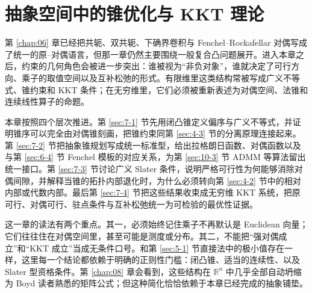 \chapter{抽象空间中的锥优化与 KKT 理论}

\label{chap:07}

第 \ref{chap:06} 章已经把共轭、双共轭、下确界卷积与 Fenchel--Rockafellar 对偶写成了统一的原--对偶语言，但那一章仍然主要围绕一般复合凸问题展开。进入本章之后，约束的几何角色会被进一步突出：谁被视为“非负对象”，谁就决定了可行方向、乘子的取值空间以及互补松弛的形式。有限维里这类结构常被写成广义不等式、锥约束和 KKT 条件；在无穷维里，它们必须被重新表述为对偶空间、法锥和连续线性算子的命题。

本章按照四个层次推进。第 \ref{sec:7-1} 节先用闭凸锥定义偏序与广义不等式，并证明锥序可以完全由对偶锥刻画，把锥约束同第 \ref{sec:4-3} 节的分离原理连接起来。第 \ref{sec:7-2} 节把抽象锥规划写成统一标准型，给出拉格朗日函数、对偶函数以及与第 \ref{sec:6-4} 节 Fenchel 模板的对应关系，为第 \ref{sec:10-3} 节 ADMM 等算法留出统一接口。第 \ref{sec:7-3} 节讨论广义 Slater 条件，说明严格可行性为何能够消除对偶间隙，并解释当锥的拓扑内部退化时，为什么必须转向第 \ref{sec:4-2} 节中的相对内部或代数内部。最后第 \ref{sec:7-4} 节把这些结果收束成无穷维 KKT 系统，把原可行、对偶可行、驻点条件与互补松弛统一为可检验的最优性证据。

这一章的读法有两个重点。其一，必须始终记住乘子不再默认是 Euclidean 向量；它们往往住在对偶空间里，甚至可能是测度或分布。其二，不能把“强对偶成立”和“KKT 成立”当成无条件口号。和第 \ref{sec:5-1} 节直接法中的极小值存在一样，这里每一个结论都依赖于明确的正则性门槛：闭凸锥、适当的连续性、以及 Slater 型资格条件。第 \ref{chap:08} 章会看到，这些结构在 $\mathbb R^n$ 中几乎全部自动坍缩为 Boyd 读者熟悉的矩阵公式；但这种简化恰恰依赖于本章已经完成的抽象铺垫。








